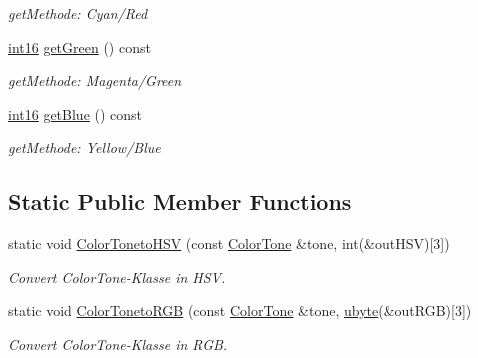 \begin{DoxyCompactItemize}
\begin{DoxyCompactList}\small\item\em getMethode: Cyan/Red \item\end{DoxyCompactList}\item 
\hypertarget{class_f2_c_1_1_color_tone_a357014741cfe8cb1403068c4d6155e1e}{
\hyperlink{namespace_f2_c_ab83c1e14d784a7d520d770ca6fa8fd8e}{int16} \hyperlink{class_f2_c_1_1_color_tone_a357014741cfe8cb1403068c4d6155e1e}{getGreen} () const }
\label{class_f2_c_1_1_color_tone_a357014741cfe8cb1403068c4d6155e1e}

\begin{DoxyCompactList}\small\item\em getMethode: Magenta/Green \item\end{DoxyCompactList}\item 
\hypertarget{class_f2_c_1_1_color_tone_a2e9e07d9fc2d3c7ac8e880ccee337d4e}{
\hyperlink{namespace_f2_c_ab83c1e14d784a7d520d770ca6fa8fd8e}{int16} \hyperlink{class_f2_c_1_1_color_tone_a2e9e07d9fc2d3c7ac8e880ccee337d4e}{getBlue} () const }
\label{class_f2_c_1_1_color_tone_a2e9e07d9fc2d3c7ac8e880ccee337d4e}

\begin{DoxyCompactList}\small\item\em getMethode: Yellow/Blue \item\end{DoxyCompactList}\end{DoxyCompactItemize}
\subsection*{Static Public Member Functions}
\begin{DoxyCompactItemize}
\item 
static void \hyperlink{class_f2_c_1_1_color_tone_a888395ee1133ec4e44683d571f719ab0}{ColorTonetoHSV} (const \hyperlink{class_f2_c_1_1_color_tone}{ColorTone} \&tone, int(\&outHSV)\mbox{[}3\mbox{]})
\begin{DoxyCompactList}\small\item\em Convert ColorTone-\/Klasse in HSV. \item\end{DoxyCompactList}\item 
static void \hyperlink{class_f2_c_1_1_color_tone_a55e96167a3106b92bfa8b28bb098b2bc}{ColorTonetoRGB} (const \hyperlink{class_f2_c_1_1_color_tone}{ColorTone} \&tone, \hyperlink{namespace_f2_c_a74fad364688add30796d711e5635ac77}{ubyte}(\&outRGB)\mbox{[}3\mbox{]})
\begin{DoxyCompactList}\small\item\em Convert ColorTone-\/Klasse in RGB. \item\end{DoxyCompactList}\end{DoxyCompactItemize}
